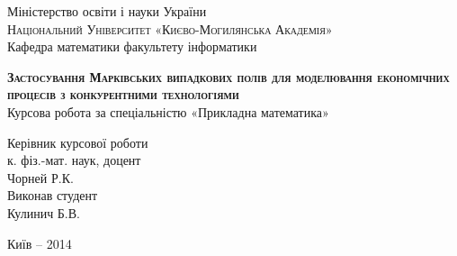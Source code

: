 \begin{titlepage}
\newpage

\begin{center}
Міністерство освіти і науки України \\
\textsc{Національний Університет «Києво-Могилянська Академія»} \\
Кафедра математики факультету інформатики
\end{center}

\vspace{8em}

\vspace{2em}

\begin{center}
\textsc{\textbf{Застосування Марківських випадкових полів для моделювання економічних процесів з конкурентними технологіями}} \\
Курсова робота за спеціальністю «Прикладна математика»
\end{center}

\vspace{6em}

\begin{flushright}
Керівник курсової роботи \\
к. фіз.-мат. наук, доцент \\
Чорней Р.К. \\
\vspace{2em}
Виконав студент \\
Кулинич Б.В. \\
\vspace{2em}

\end{flushright}

\vspace{\fill}

\begin{center}
Київ – 2014
\end{center}

\end{titlepage}